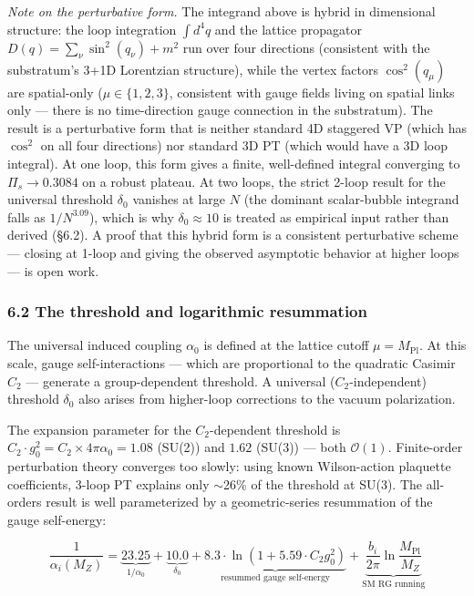 \documentclass[
]{article}
\begin{document}
\emph{Note on the perturbative form.} The integrand above is hybrid in
dimensional structure: the loop integration \(\int d^4q\) and the
lattice propagator \(D(q) = \sum_\nu \sin^2(q_\nu) + m^2\) run over four
directions (consistent with the substratum's 3+1D Lorentzian structure),
while the vertex factors \(\cos^2(q_\mu)\) are spatial-only
(\(\mu \in \{1,2,3\}\), consistent with gauge fields living on spatial
links only --- there is no time-direction gauge connection in the
substratum). The result is a perturbative form that is neither standard
4D staggered VP (which has \(\cos^2\) on all four directions) nor
standard 3D PT (which would have a 3D loop integral). At one loop, this
form gives a finite, well-defined integral converging to
\(\Pi_s \to 0.3084\) on a robust plateau. At two loops, the strict
2-loop result for the universal threshold \(\delta_0\) vanishes at large
\(N\) (the dominant scalar-bubble integrand falls as \(1/N^{3.09}\)),
which is why \(\delta_0 \approx 10\) is treated as empirical input
rather than derived (§6.2). A proof that this hybrid form is a
consistent perturbative scheme --- closing at 1-loop and giving the
observed asymptotic behavior at higher loops --- is open work.

\hypertarget{the-threshold-and-logarithmic-resummation}{%
\subsubsection{6.2 The threshold and logarithmic
resummation}\label{the-threshold-and-logarithmic-resummation}}

The universal induced coupling \(\alpha_0\) is defined at the lattice
cutoff \(\mu = M_{\text{Pl}}\). At this scale, gauge self-interactions
--- which are proportional to the quadratic Casimir \(C_2\) --- generate
a group-dependent threshold. A universal (\(C_2\)-independent) threshold
\(\delta_0\) also arises from higher-loop corrections to the vacuum
polarization.

The expansion parameter for the \(C_2\)-dependent threshold is
\(C_2 \cdot g_0^2 = C_2 \times 4\pi\alpha_0 = 1.08\) (SU(2)) and
\(1.62\) (SU(3)) --- both \(\mathcal{O}(1)\). Finite-order perturbation
theory converges too slowly: using known Wilson-action plaquette
coefficients, 3-loop PT explains only $\sim$26\% of the threshold at
SU(3). The all-orders result is well parameterized by a geometric-series
resummation of the gauge self-energy:

\[\frac{1}{\alpha_i(M_Z)} = \underbrace{23.25}_{1/\alpha_0} + \underbrace{10.0}_{\delta_0} + \underbrace{8.3 \cdot \ln\!\left(1 + 5.59 \cdot C_2 g_0^2\right)}_{\text{resummed gauge self-energy}} + \underbrace{\frac{b_i}{2\pi}\ln\frac{M_{\text{Pl}}}{M_Z}}_{\text{SM RG running}}\]
\end{document}
